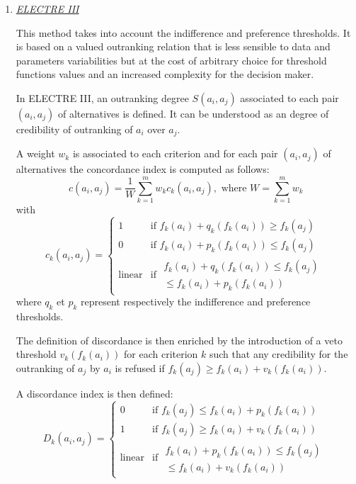 \begin{enumerate}
\item \textit{\underline{ELECTRE III}}

This method takes into account the indifference and preference thresholds. It is based on a valued outranking relation that is less sensible to data and parameters variabilities but at the cost of arbitrary choice for threshold functions values and an increased complexity for the decision maker.

In ELECTRE III, an outranking degree $S(a_i, a_j)$ associated to each pair $(a_i, a_j)$ of alternatives is defined. It can be understood as an \og degree of credibility of outranking \fg of $a_i$ over $a_j$.

A weight $w_{k}$ is associated to each criterion and for each pair $(a_i, a_j)$ of alternatives the concordance index is computed as follows:
\begin{equation}
c(a_i, a_j) = \frac{1}{W} \sum_{k=1}^{m} w_{k} c_{k}(a_i, a_j), \text{ where } W = \sum_{k=1}^{m} w_{k}
\end{equation}
with
\begin{equation}
c_{k}(a_i,a_j) = \begin{cases}
	1& \text{if } f_{k}(a_i)+q_{k}(f_{k}(a_i)) \geq f_{k}(a_j)\\
	0& \text{if } f_{k}(a_i)+p_{k}(f_{k}(a_i)) \leq f_{k}(a_j)\\
	\text{linear}& \text{if } \begin{array}{rr} f_{k}(a_i)+q_{k}(f_{k}(a_i)) \leq f_{k}(a_j)\\
	\leq f_{k}(a_i)+p_{k}(f_{k}(a_i)) \end{array}
	\end{cases}
\end{equation}
where $q_{k}$ et $p_{k}$ represent respectively the indifference and preference thresholds.

The definition of discordance is then enriched by the introduction of a veto threshold $v_k(f_k(a_i))$ for each criterion $k$ such that any credibility for the outranking of $a_j$ by $a_i$ is refused if $f_k(a_j) \geq f_k(a_i) + v_k(f_k(a_i))$.

A discordance index is then defined:
\begin{equation}
D_k(a_i, a_j) = \begin{cases}
	0 & \text{if } f_k(a_j) \leq f_k(a_i) + p_k(f_k(a_i))\\
	1 & \text{if } f_k(a_j) \geq f_k(a_i) + v_k(f_k(a_i))\\
	\text{linear} & \text{if } \begin{array}{rr} f_k(a_i) + p_k(f_k(a_i)) \leq f_k(a_j)\\
	\leq f_k(a_i) + v_k(f_k(a_i)) \end{array}
	\end{cases}
\end{equation}


\end{enumerate}
